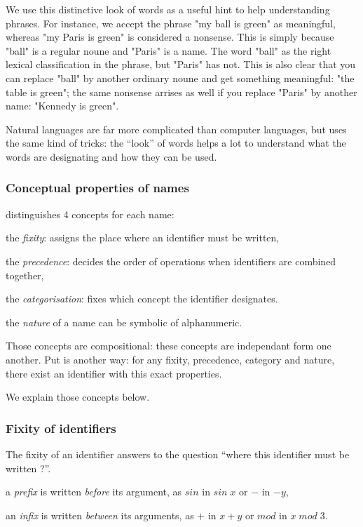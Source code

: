 We use this distinctive look of words as a useful hint to help understanding
phrases. For instance, we accept the phrase "my ball is green" as meaningful,
whereas "my Paris is green" is considered a nonsense. This is simply because
"ball" is a regular noune and "Paris" is a name. The word "ball" as the right
lexical classification in the phrase, but "Paris" has not. This is also clear
that you can replace "ball" by another ordinary noune and get something
meaningful: "the table is green"; the same nonsense arrises as well if you
replace "Paris" by another name: "Kennedy is green".

Natural languages are far more complicated than computer languages, but
{\focalize} uses the same kind of tricks: the ``look'' of words helps a lot to
understand what the words are designating and how they can be used.

\subsubsection{Conceptual properties of names}

{\focal} distinguishes 4 concepts for each name:

\begin{citemize}
\item the {\em fixity}: assigns the place where an identifier must be written,
\item the {\em precedence}: decides the order of operations when
  identifiers are combined together,
\item the {\em categorisation}: fixes which concept the identifier designates.
\item the {\em nature} of a name can be symbolic of alphanumeric.
\end{citemize}

Those concepts are compositional: these concepts are independant form one
another. Put is another way: for any fixity, precedence, category and nature,
there exist an identifier with this exact properties.

We explain those concepts below.

\subsubsection{Fixity of identifiers}

The fixity of an identifier answers to the question ``where this identifier
must be written ?''.
\begin{citemize}
\item a {\em prefix} is written {\em before} its argument, as $sin$ in $sin\;
  x$ or $-$ in $- y$,
\item an {\em infix} is written {\em between} its arguments, as $+$ in $x +
  y$ or $mod$ in $x\; mod \;3$.
\end{citemize}

